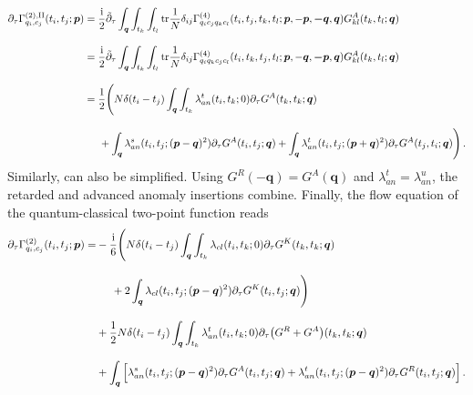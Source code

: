 \documentclass[reprint,english,superscriptaddress,preprintnumbers,amsmath,amssymb,aps,prd]{revtex4-1}
\begin{document}
\begin{align}
    \partial_{\tau}\Gamma_{q_i,c_j}^{(2),\mathrm{II}}(t_i,t_j;\boldsymbol{p})&=\frac{\mathrm{i}}{2}\tilde{\partial}_{\tau}\int_{\boldsymbol{q}}\int_{t_k}\int_{t_l}\mathrm{tr}\frac{1}{N}\delta_{ij}\Gamma_{q_{i}c_{j}q_{k}c_{l}}^{(4)}(t_i,t_j,t_k,t_l;\boldsymbol{p},-\boldsymbol{p},\boldsymbol{-q},\boldsymbol{q})G^{A}_{kl}(t_k,t_l;\boldsymbol{q})\nonumber\\[2ex]
    &=\frac{\mathrm{i}}{2}\tilde{\partial}_{\tau}\int_{\boldsymbol{q}}\int_{t_k}\int_{t_l}\mathrm{tr}\frac{1}{N}\delta_{ij}\Gamma_{q_{i}q_{k}c_{j}c_{l}}^{(4)}(t_i,t_k,t_j,t_l;\boldsymbol{p},-\boldsymbol{q},\boldsymbol{-p},\boldsymbol{q})G^{A}_{kl}(t_k,t_l;\boldsymbol{q})\nonumber\\[2ex]
    &=\frac{\mathrm{1}}{2}\Bigg(N\delta(t_i-t_j)\int_{\boldsymbol{q}}\int_{t_k}\lambda_{an}^{t}(t_i,t_k;0)\partial_{\tau}G^{A}(t_k,t_k;\boldsymbol{q})\nonumber\\[2ex]
    &\hspace{0.5cm}+\int_{\boldsymbol{q}}\lambda_{an}^{s}(t_i,t_j;(\boldsymbol{p}-\boldsymbol{q})^2)\partial_{\tau}G^{A}(t_i,t_j;\boldsymbol{q})+\int_{\boldsymbol{q}}\lambda_{an}^{t}(t_i,t_j;(\boldsymbol{p}+\boldsymbol{q})^2)\partial_{\tau}G^{A}(t_j,t_i;\boldsymbol{q})\Bigg)\,.
\end{align}
Similarly,  can also be simplified. Using $G^{R}(-\boldsymbol{q})=G^{A}(\boldsymbol{q})$ and $\lambda_{an}^{t}=\lambda_{an}^{u}$, the retarded and advanced anomaly insertions combine. Finally, the flow equation of the quantum-classical two-point function reads
\begin{align}
    \partial_{\tau}\Gamma_{q_i,c_j}^{(2)}(t_i,t_j;\boldsymbol{p})=&-\frac{\mathrm{i}}{6}\Bigg(N\delta(t_i-t_j)\int_{\boldsymbol{q}}\int_{t_k}\lambda_{cl}(t_i,t_k;0)\partial_{\tau}G^{K}(t_k,t_k;\boldsymbol{q})\nonumber\\[2ex]
    &\hspace{0.5cm}+2\int_{\boldsymbol{q}}\lambda_{cl}(t_i,t_j;(\boldsymbol{p}-\boldsymbol{q})^2)\partial_{\tau}G^{K}(t_i,t_j;\boldsymbol{q})\Bigg)\nonumber\\[2ex]
    &+\frac{1}{2}N\delta(t_i-t_j)\int_{\boldsymbol{q}}\int_{t_k}\lambda_{an}^{t}(t_i,t_k;0)\partial_{\tau}\big(G^{R}+G^{A}\big)(t_k,t_k;\boldsymbol{q})\nonumber\\[2ex]
    &+\int_{\boldsymbol{q}}\Big[\lambda_{an}^{s}(t_i,t_j;(\boldsymbol{p}-\boldsymbol{q})^2)\partial_{\tau}G^{A}(t_i,t_j;\boldsymbol{q})+\lambda_{an}^{t}(t_i,t_j;(\boldsymbol{p}-\boldsymbol{q})^2)\partial_{\tau}G^{R}(t_i,t_j;\boldsymbol{q})\Big]\,.\label{eq:qc-final}
\end{align}
\end{document}
